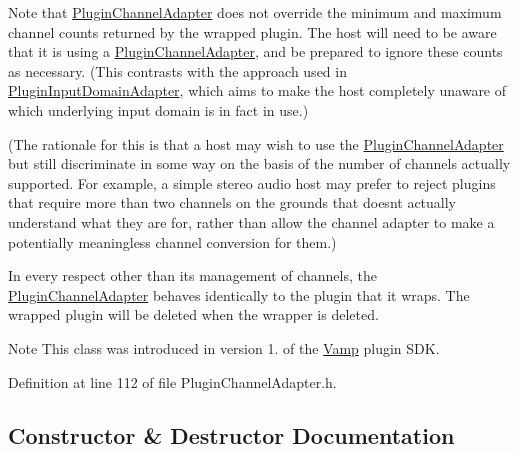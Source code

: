 Note that \hyperlink{class_vamp_1_1_host_ext_1_1_plugin_channel_adapter}{Plugin\+Channel\+Adapter} does not override the minimum and maximum channel counts returned by the wrapped plugin. The host will need to be aware that it is using a \hyperlink{class_vamp_1_1_host_ext_1_1_plugin_channel_adapter}{Plugin\+Channel\+Adapter}, and be prepared to ignore these counts as necessary. (This contrasts with the approach used in \hyperlink{class_vamp_1_1_host_ext_1_1_plugin_input_domain_adapter}{Plugin\+Input\+Domain\+Adapter}, which aims to make the host completely unaware of which underlying input domain is in fact in use.)

(The rationale for this is that a host may wish to use the \hyperlink{class_vamp_1_1_host_ext_1_1_plugin_channel_adapter}{Plugin\+Channel\+Adapter} but still discriminate in some way on the basis of the number of channels actually supported. For example, a simple stereo audio host may prefer to reject plugins that require more than two channels on the grounds that doesn\textquotesingle{}t actually understand what they are for, rather than allow the channel adapter to make a potentially meaningless channel conversion for them.)

In every respect other than its management of channels, the \hyperlink{class_vamp_1_1_host_ext_1_1_plugin_channel_adapter}{Plugin\+Channel\+Adapter} behaves identically to the plugin that it wraps. The wrapped plugin will be deleted when the wrapper is deleted.

\begin{DoxyNote}{Note}
This class was introduced in version 1. of the \hyperlink{namespace_vamp}{Vamp} plugin S\+DK. 
\end{DoxyNote}


Definition at line 112 of file Plugin\+Channel\+Adapter.\+h.



\subsection{Constructor \& Destructor Documentation}
